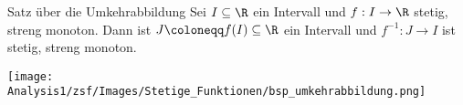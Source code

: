 \begin{lemma}{Satz über die Umkehrabbildung}
    Sei $I \subseteq \R$ ein Intervall und $f:I \to \R$ stetig, streng monoton. Dann ist $J \coloneqq f(I) \subseteq \R$ ein Intervall und $f^{-1}: J \to I$ ist stetig, streng monoton.
\end{lemma}

\begin{example}
    \texttt{[image: Analysis1/zsf/Images/Stetige\_Funktionen/bsp\_umkehrabbildung.png]}
\end{example}

